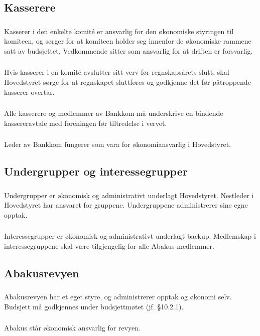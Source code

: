 \subsection{Kasserere}

\subsubsection{}
Kasserer i den enkelte komité er ansvarlig for den økonomiske styringen til
komiteen, og sørger for at komiteen holder seg innenfor de økonomiske rammene satt av budsjettet.
Vedkommende sitter som ansvarlig for at driften er forsvarlig.

\subsubsection{}
Hvis kasserer i en komité avslutter sitt verv før regnskapsårets slutt, skal Hovedstyret sørge for at regnskapet sluttføres og godkjenne det før påtroppende kasserer overtar.

\subsubsection{}
Alle kasserere og medlemmer av Bankkom må underskrive en bindende kassereravtale med foreningen før tiltredelse i vervet.

\subsubsection{}
Leder av Bankkom fungerer som vara for økonomiansvarlig i Hovedstyret.

\subsection{Undergrupper og interessegrupper}

\subsubsection{}
Undergrupper er økonomisk og administrativt underlagt Hovedstyret. Nestleder i
Hovedstyret har ansvaret for gruppene. Undergruppene administrerer sine egne
opptak.

\subsubsection{}
Interessegrupper er økonomisk og administrativt underlagt backup. Medlemskap i
interessegruppene skal være tilgjengelig for alle Abakus-medlemmer.

\subsection{Abakusrevyen}

\subsubsection{}
Abakusrevyen har et eget styre, og administrerer opptak og økonomi selv. Budsjett må godkjennes under budsjettmøtet (jf. §10.2.1).

\subsubsection{}
Abakus står økonomisk ansvarlig for revyen.
